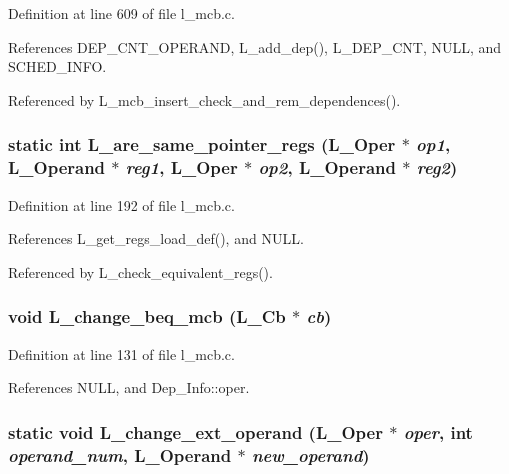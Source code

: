 Definition at line 609 of file l\_\-mcb.c.

References DEP\_\-CNT\_\-OPERAND, L\_\-add\_\-dep(), L\_\-DEP\_\-CNT, NULL, and SCHED\_\-INFO.

Referenced by L\_\-mcb\_\-insert\_\-check\_\-and\_\-rem\_\-dependences().
\subsubsection{\setlength{\rightskip}{0pt plus 5cm}static int L\_\-are\_\-same\_\-pointer\_\-regs (L\_\-Oper $\ast$ {\em op1}, L\_\-Operand $\ast$ {\em reg1}, L\_\-Oper $\ast$ {\em op2}, L\_\-Operand $\ast$ {\em reg2})\hspace{0.3cm}{\tt  [static]}}\label{l__mcb_8c_ac402c12aca7290c76d4eec6758f5480}




Definition at line 192 of file l\_\-mcb.c.

References L\_\-get\_\-regs\_\-load\_\-def(), and NULL.

Referenced by L\_\-check\_\-equivalent\_\-regs().
\subsubsection{\setlength{\rightskip}{0pt plus 5cm}void L\_\-change\_\-beq\_\-mcb (L\_\-Cb $\ast$ {\em cb})}\label{l__mcb_8c_a9aa874499a28b5d29c17cdd1084e064}




Definition at line 131 of file l\_\-mcb.c.

References NULL, and Dep\_\-Info::oper.
\subsubsection{\setlength{\rightskip}{0pt plus 5cm}static void L\_\-change\_\-ext\_\-operand (L\_\-Oper $\ast$ {\em oper}, int {\em operand\_\-num}, L\_\-Operand $\ast$ {\em new\_\-operand})\hspace{0.3cm}{\tt  [static]}}\label{l__mcb_8c_b1d13da98f43d492e0a01955f1906d58}




